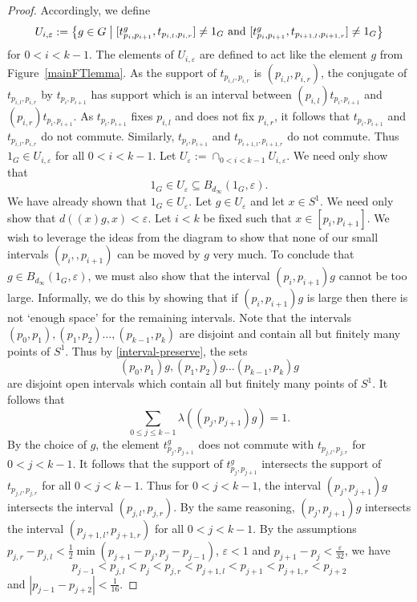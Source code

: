 \documentclass[11pt]{amsart}
\makeatletter
\newcommand{\makeset}[2]{\left\lbrace #1 \;\middle|\;
 \begin{tabular}{@{}l@{}}
   #2
  \end{tabular}
  \right\rbrace}
\makeatother
\begin{document}
\begin{proof}
Accordingly, we define
    \[U_{i,\varepsilon}:=\makeset{g\in G}{\([t_{p_i,p_{i+1}}^{g},t_{p_{i,l},p_{i,r}}]\neq 1_G\) and \([t_{p_i,p_{i+1}}^{g},t_{p_{i+1,l},p_{i+1,r}}]\neq 1_G\)}\]
    for \(0<i<k-1\). The elements of \(U_{i, \varepsilon}\) are defined to act like the element \(g\) from Figure~\ref{mainFTlemma}.
    As the support of \(t_{p_{i,l}, p_{i,r}}\) is \((p_{i,l}, p_{i,r})\), the conjugate of \(t_{p_{i,l}, p_{i,r}}\) by \(t_{p_{i}, p_{i+1}}\) has support which is an interval between
\((p_{i,l})t_{p_{i}, p_{i+1}}\) and \((p_{i,r})t_{p_{i}, p_{i+1}}\). As \(t_{p_{i}, p_{i+1}}\) fixes \(p_{i,l}\) and does not fix \(p_{i,r}\), it follows that \(t_{p_{i}, p_{i+1}}\) and \(t_{p_{i,l}, p_{i,r}}\) do not commute.
Similarly, \(t_{p_{i}, p_{i+1}}\) and \(t_{p_{i+1,l}, p_{i+1,r}}\) do not commute. Thus \(1_G\in U_{i, \varepsilon}\) for all \(0<i<k-1\).
Let \(U_{\varepsilon}:=\cap_{0<i<k-1} U_{i, \varepsilon}\). We need only show that
\[1_G\in U_\varepsilon \subseteq B_{d_\infty}(1_G,\varepsilon).\]
We have already shown that \(1_G\in U_\varepsilon\).
Let \(g\in U_\varepsilon\) and let \(x\in S^1\). We need only show that \(d((x)g,x)<\varepsilon\).
Let \(i<k\) be fixed such that \(x\in [p_i,p_{i+1}]\). 
We wish to leverage the ideas from the diagram to show that none of our small intervals \((p_{i},,p_{i+1})\) can be moved by \(g\) very much. To conclude that \(g\in B_{d_\infty}(1_G,\varepsilon)\), we must also show that the interval \((p_{i},p_{i+1})g\) cannot be too large. 
Informally, we do this by showing that if \((p_{i},p_{i+1})g\) is large then there is not `enough space' for the remaining intervals.
Note that the intervals \((p_0, p_1),(p_1,p_2)\ldots, (p_{k-1},p_k)\) are disjoint and contain all but finitely many points of \(S^1\).
Thus by \cref{interval-preserve}, the sets 
\[(p_0, p_1)g,(p_1,p_2)g\ldots (p_{k-1},p_k)g\]
are disjoint open intervals which contain all but finitely many points of \(S^{1}\). It follows that
\[\sum_{0\leq j\leq k-1} \lambda((p_j, p_{j+1})g)=1.\]
By the choice of \(g\), the element \(t_{p_{j},p_{j+1}}^g\) does not commute with \(t_{p_{j,l},p_{j,r}}\) for \(0<j<k-1\). 
It follows that the support of \(t_{p_{j},p_{j+1}}^g\) intersects the support of \(t_{p_{j,l},p_{j,r}}\) for all \(0<j<k-1\).
Thus for \(0<j<k-1\), the interval \((p_j, p_{j+1})g\) intersects the interval \((p_{j,l},p_{j,r})\).
By the same reasoning, \((p_j, p_{j+1})g\) intersects the interval \((p_{j+1,l},p_{j+1,r})\) for all \(0<j<k-1\). 
By the assumptions $p_{j,r}-p_{j,l}<\frac{1}{2}\min(p_{j+1}-p_j,p_{j}-p_{j-1})$, $\varepsilon<1$ and $p_{j+1}-p_j<\frac{\varepsilon}{32}$, we have \[p_{j-1}<p_{j,l}<p_{j}<p_{j,r}<p_{j+1,l}<p_{j+1}<p_{j+1,r}<p_{j+2}\] and \(|p_{j-1}-p_{j+2}|< \frac{1}{16}\). 

\end{proof}
\end{document}
